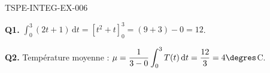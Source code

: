\begin{corrige}{TSPE-INTEG-EX-006}

\textbf{Q1.} $\displaystyle\int_0^3 (2t+1)\,\mathrm{d}t = \left[t^2+t\right]_0^3 = (9+3)-0 = 12$.

\textbf{Q2.} Température moyenne : $\mu = \dfrac{1}{3-0}\displaystyle\int_0^3 T(t)\,\mathrm{d}t = \dfrac{12}{3} = 4\degres$C.

\end{corrige}
